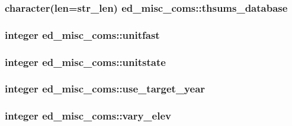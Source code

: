 \subsubsection[{thsums\+\_\+database}]{\setlength{\rightskip}{0pt plus 5cm}character(len=str\+\_\+len) ed\+\_\+misc\+\_\+coms\+::thsums\+\_\+database}\label{namespaceed__misc__coms_a2c12061ad27449088c196919983f9223}
\hypertarget{namespaceed__misc__coms_a201ad3ab376db2b9861c473fa72f4ca4}{}
\subsubsection[{unitfast}]{\setlength{\rightskip}{0pt plus 5cm}integer ed\+\_\+misc\+\_\+coms\+::unitfast}\label{namespaceed__misc__coms_a201ad3ab376db2b9861c473fa72f4ca4}
\hypertarget{namespaceed__misc__coms_a5018c6cb5f287c675aba66d451e25afc}{}
\subsubsection[{unitstate}]{\setlength{\rightskip}{0pt plus 5cm}integer ed\+\_\+misc\+\_\+coms\+::unitstate}\label{namespaceed__misc__coms_a5018c6cb5f287c675aba66d451e25afc}
\hypertarget{namespaceed__misc__coms_ae4a76d724faf120b2006204ff0ef23c1}{}
\subsubsection[{use\+\_\+target\+\_\+year}]{\setlength{\rightskip}{0pt plus 5cm}integer ed\+\_\+misc\+\_\+coms\+::use\+\_\+target\+\_\+year}\label{namespaceed__misc__coms_ae4a76d724faf120b2006204ff0ef23c1}
\hypertarget{namespaceed__misc__coms_ab21ac81aaca643770273c9cd7459fdf4}{}
\subsubsection[{vary\+\_\+elev}]{\setlength{\rightskip}{0pt plus 5cm}integer ed\+\_\+misc\+\_\+coms\+::vary\+\_\+elev}\label{namespaceed__misc__coms_ab21ac81aaca643770273c9cd7459fdf4}
\hypertarget{namespaceed__misc__coms_aeaa438f9adddfed7efc7723a54a0c4c1}{}
